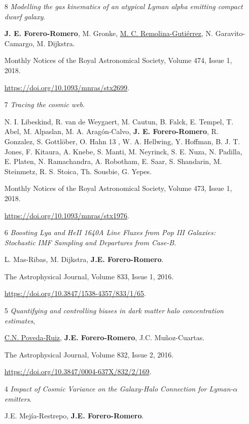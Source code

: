 \documentclass{article}
\begin{document}
\begin{itemize}

\item[8]{\it Modelling the gas kinematics of an atypical Lyman alpha
emitting compact dwarf galaxy}.

{\bf J. E. Forero-Romero}, M. Gronke,
  \underline{M. C. Remolina-Guti\'errez}, N. Garavito-Camargo, M. Dijkstra.

  Monthly Notices of the Royal Astronomical Society, Volume 474, Issue
  1, 2018. 

\url{https://doi.org/10.1093/mnras/stx2699}.  

\item[7]{\it Tracing the cosmic web}.

N. I. Libeskind, R. van de
  Weygaert, M. Cautun, B. Falck, E. Tempel, T. Abel, M. Alpaslan, M. A. Aragón-Calvo, {\bf
  J. E. Forero-Romero},  R. Gonzalez, S. Gottl\"ober, O. Hahn 13 ,
W. A. Hellwing, Y. Hoffman, B. J. T. Jones, F. Kitaura, A. Knebe,
S. Manti, M. Neyrinck, S. E. Nuza, N. Padilla, E. Platen,
N. Ramachandra, A. Robotham, E. Saar, S. Shandarin, M. Steinmetz,
R. S. Stoica, Th. Sousbie, G. Yepes.

Monthly Notices of the Royal Astronomical Society, Volume 473, Issue
1, 2018. 

\url{https://doi.org/10.1093/mnras/stx1976}. 

\item[6]{\it Boosting Lya and HeII 1640A Line Fluxes from Pop III
  Galaxies: Stochastic IMF Sampling and Departures from
  Case-B}. 

L. Mas-Ribas, M. Dijkstra, {\bf J.E. Forero-Romero}.

The Astrophysical Journal, Volume 833, Issue 1, 2016. 

\url{https://doi.org/10.3847/1538-4357/833/1/65}. 


\item[5]{\it Quantifying and controlling biases in dark matter halo
  concentration estimates}, 

\underline{C.N. Poveda-Ruiz}, {\bf J.E. Forero-Romero}, J.C. Mu\~noz-Cuartas. 

The Astrophysical Journal, Volume 832, Issue 2, 2016. 

\url{https://doi.org/10.3847/0004-637X/832/2/169}.

\item[4]{\it Impact of Cosmic Variance on the Galaxy-Halo Connection
  for Lyman-$\alpha$ emitters}.  

J.E. Mej\'ia-Restrepo, {\bf J.E. Forero-Romero}.


\end{itemize}
\end{document}
